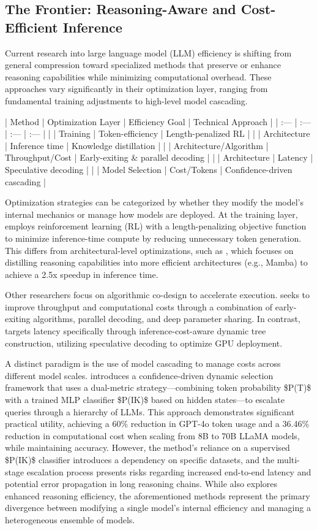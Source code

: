 \documentclass[11pt]{article}
\begin{document}
\subsection{The Frontier: Reasoning-Aware and Cost-Efficient Inference}

Current research into large language model (LLM) efficiency is shifting from general compression toward specialized methods that preserve or enhance reasoning capabilities while minimizing computational overhead. These approaches vary significantly in their optimization layer, ranging from fundamental training adjustments to high-level model cascading.

| Method | Optimization Layer | Efficiency Goal | Technical Approach |
| :--- | :--- | :--- | :--- |
| \citep{2502.04463} | Training | Token-efficiency | Length-penalized RL |
| \citep{2502.20339} | Architecture | Inference time | Knowledge distillation |
| \citep{2509.05915} | Architecture/Algorithm | Throughput/Cost | Early-exiting \& parallel decoding |
| \citep{2510.26577} | Architecture | Latency | Speculative decoding |
| \citep{2602.22090} | Model Selection | Cost/Tokens | Confidence-driven cascading |

Optimization strategies can be categorized by whether they modify the model's internal mechanics or manage how models are deployed. At the training layer, \citep{2502.04463} employs reinforcement learning (RL) with a length-penalizing objective function to minimize inference-time compute by reducing unnecessary token generation. This differs from architectural-level optimizations, such as \citep{2502.20339}, which focuses on distilling reasoning capabilities into more efficient architectures (e.g., Mamba) to achieve a 2.5x speedup in inference time.

Other researchers focus on algorithmic co-design to accelerate execution. \citep{2509.05915} seeks to improve throughput and computational costs through a combination of early-exiting algorithms, parallel decoding, and deep parameter sharing. In contrast, \citep{2510.26577} targets latency specifically through inference-cost-aware dynamic tree construction, utilizing speculative decoding to optimize GPU deployment.

A distinct paradigm is the use of model cascading to manage costs across different model scales. \citep{2602.22090} introduces a confidence-driven dynamic selection framework that uses a dual-metric strategy—combining token probability \$P(T)\$ with a trained MLP classifier \$P(IK)\$ based on hidden states—to escalate queries through a hierarchy of LLMs. This approach demonstrates significant practical utility, achieving a 60\% reduction in GPT-4o token usage and a 36.46\% reduction in computational cost when scaling from 8B to 70B LLaMA models, while maintaining accuracy. However, the method's reliance on a supervised \$P(IK)\$ classifier introduces a dependency on specific datasets, and the multi-stage escalation process presents risks regarding increased end-to-end latency and potential error propagation in long reasoning chains. While \citep{2605.14036} also explores enhanced reasoning efficiency, the aforementioned methods represent the primary divergence between modifying a single model's internal efficiency and managing a heterogeneous ensemble of models.
\end{document}
